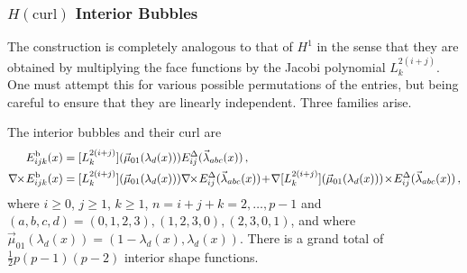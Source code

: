 \subsubsection{\texorpdfstring{$H(\mathrm{curl})$}{Hcurl} Interior Bubbles}


The construction is completely analogous to that of $H^1$ in the sense that they are obtained by multiplying the face functions by the Jacobi polynomial $L_k^{2(i+j)}$.
One must attempt this for various possible permutations of the entries, but being careful to ensure that they are linearly independent.
Three families arise.

The interior bubbles and their curl are
\begin{equation}
	\begin{aligned}
		E_{ijk}^\mathrm{b}(x)&=[L_k^{2(i+j)}](\vec{\mu}_{01}(\lambda_d(x)))E_{ij}^\Tri(\vec{\lambda}_{abc}(x))\,,\\
		\nabla\!\!\times\! E_{ijk}^\mathrm{b}(x)&=[L_k^{2(i+j)}](\vec{\mu}_{01}(\lambda_d(x)))
			\nabla\!\!\times\! E_{ij}^\Tri(\vec{\lambda}_{abc}(x))
				\!+\!\nabla[L_k^{2(i+j)}](\vec{\mu}_{01}(\lambda_d(x)))\!\times\! E_{ij}^\Tri(\vec{\lambda}_{abc}(x))\,,
	\end{aligned}
\end{equation}
where $i\geq0$, $j\geq1$, $k\geq1$, $n=i+j+k=2,\ldots,p-1$ and $(a,b,c,d)=(0,1,2,3),(1,2,3,0),(2,3,0,1)$, and where $\vec{\mu}_{01}(\lambda_d(x))=(1-\lambda_d(x),\lambda_d(x))$.
There is a grand total of $\frac{1}{2}p(p-1)(p-2)$ interior shape functions.



